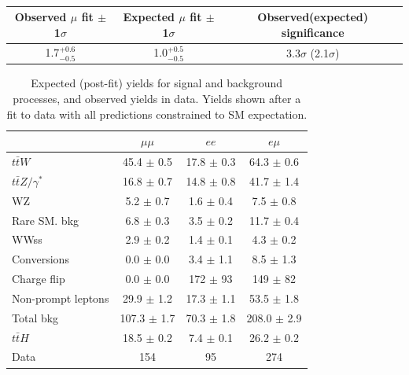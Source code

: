 \begin{table}[htbp]
\begin{center}
  \caption[Table of best-fit signal strength]{}
    \begin{tabular}{c c c} \hline
      Observed $\mu$ fit $\pm$1$\sigma$ & Expected $\mu$ fit $\pm$1$\sigma$ & Observed(expected) significance & \\ \hline 
      1.7$^{+0.6}_{-0.5}$ & 1.0$^{+0.5}_{-0.5}$ & 3.3$\sigma$ (2.1$\sigma$)  \\
      \hline
    \end{tabular}
    \label{tab:mu}
\end{center}
\end{table}


\begin{table}[htbp]
  \begin{center}
    \caption[Signal region post-fit event yields by lepton flavor]{Expected (post-fit) yields for signal and background processes, and observed yields in data. Yields
      shown after a fit to data with all predictions constrained to SM expectation.}
    \begin{tabular}{l c c c} \hline
      & $\mu\mu$ & $ee$ & $e\mu$  \\ \hline 
      $t\bar{t}W$ & 45.4 $\pm$ 0.5 & 17.8 $\pm$ 0.3 & 64.3 $\pm$ 0.6 \\
      $t\bar{t}Z/\gamma^{*}$ & 16.8 $\pm$ 0.7 & 14.8 $\pm$ 0.8 & 41.7 $\pm$ 1.4 \\
      \hline
      WZ & 5.2 $\pm$ 0.7 & 1.6 $\pm$ 0.4 & 7.5 $\pm$ 0.8 \\
      Rare SM. bkg & 6.8 $\pm$ 0.3 & 3.5 $\pm$ 0.2 & 11.7 $\pm$ 0.4 \\
      WWss & 2.9 $\pm$ 0.2 & 1.4 $\pm$ 0.1 & 4.3 $\pm$ 0.2 \\
      \hline
      Conversions & 0.0 $\pm$ 0.0 & 3.4 $\pm$ 1.1 & 8.5 $\pm$ 1.3 \\
      Charge flip & 0.0 $\pm$ 0.0 & 172 $\pm$ 93 & 149 $\pm$ 82 \\
      Non-prompt leptons & 29.9 $\pm$ 1.2 & 17.3 $\pm$ 1.1 & 53.5 $\pm$ 1.8 \\
      \hline
      Total bkg & 107.3 $\pm$ 1.7 & 70.3 $\pm$ 1.8 & 208.0 $\pm$ 2.9 \\
      \hline
      $t\bar{t}H$ & 18.5 $\pm$ 0.2 & 7.4 $\pm$ 0.1 & 26.2 $\pm$ 0.2 \\
      \hline
      Data & 154 & 95 & 274 \\
      \hline
    \end{tabular}
    \label{tab:yields}
  \end{center}
\end{table}


